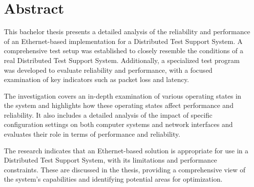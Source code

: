 \cleardoublepage

\chapter*{Abstract}
This bachelor thesis presents a detailed analysis of the reliability and performance of an Ethernet-based implementation for a Distributed Test Support System. A comprehensive test setup was established to closely resemble the conditions of a real Distributed Test Support System. Additionally, a specialized test program was developed to evaluate reliability and performance, with a focused examination of key indicators such as packet loss and latency.

The investigation covers an in-depth examination of various operating states in the system and highlights how these operating states affect performance and reliability. It also includes a detailed analysis of the impact of specific configuration settings on both computer systems and network interfaces and evaluates their role in terms of performance and reliability.

The research indicates that an Ethernet-based solution is appropriate for use in a Distributed Test Support System, with its limitations and performance constraints. These are discussed in the thesis, providing a comprehensive view of the system's capabilities and identifying potential areas for optimization.